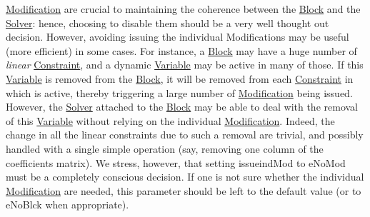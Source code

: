 \mbox{\hyperlink{class_s_m_spp__di__unipi__it_1_1_modification}{Modification}} are crucial to maintaining the coherence between the \mbox{\hyperlink{class_s_m_spp__di__unipi__it_1_1_block}{Block}} and the \mbox{\hyperlink{class_s_m_spp__di__unipi__it_1_1_solver}{Solver}}\+: hence, choosing to disable them should be a very well thought out decision. However, avoiding issuing the individual Modifications may be useful (more efficient) in some cases. For instance, a \mbox{\hyperlink{class_s_m_spp__di__unipi__it_1_1_block}{Block}} may have a huge number of {\itshape linear} \mbox{\hyperlink{class_s_m_spp__di__unipi__it_1_1_constraint}{Constraint}}, and a dynamic \mbox{\hyperlink{class_s_m_spp__di__unipi__it_1_1_variable}{Variable}} may be active in many of those. If this \mbox{\hyperlink{class_s_m_spp__di__unipi__it_1_1_variable}{Variable}} is removed from the \mbox{\hyperlink{class_s_m_spp__di__unipi__it_1_1_block}{Block}}, it will be removed from each \mbox{\hyperlink{class_s_m_spp__di__unipi__it_1_1_constraint}{Constraint}} in which is active, thereby triggering a large number of \mbox{\hyperlink{class_s_m_spp__di__unipi__it_1_1_modification}{Modification}} being issued. However, the \mbox{\hyperlink{class_s_m_spp__di__unipi__it_1_1_solver}{Solver}} attached to the \mbox{\hyperlink{class_s_m_spp__di__unipi__it_1_1_block}{Block}} may be able to deal with the removal of this \mbox{\hyperlink{class_s_m_spp__di__unipi__it_1_1_variable}{Variable}} without relying on the individual \mbox{\hyperlink{class_s_m_spp__di__unipi__it_1_1_modification}{Modification}}. Indeed, the change in all the linear constraints due to such a removal are trivial, and possibly handled with a single simple operation (say, removing one column of the coefficients matrix). We stress, however, that setting issueind\+Mod to e\+No\+Mod must be a completely conscious decision. If one is not sure whether the individual \mbox{\hyperlink{class_s_m_spp__di__unipi__it_1_1_modification}{Modification}} are needed, this parameter should be left to the default value (or to e\+No\+Blck when appropriate). \mbox{\label{class_s_m_spp__di__unipi__it_1_1_block_a176ce3ef1f4a8c33e242acb066482d45}} 
